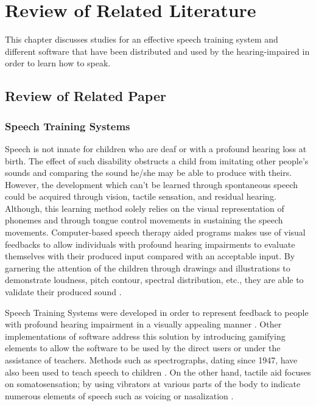 %
%
%                 

\chapter{Review of Related Literature}
\label{sec:relatedlit}

This chapter discusses studies for an effective speech training system and different software that have been distributed and used by the hearing-impaired in order to learn how to speak.

\section{Review of Related Paper}

\subsection{Speech Training Systems}

Speech is not innate for children who are deaf or with a profound hearing loss at birth. The effect of such disability obstructs a child from imitating other people’s sounds and comparing the sound he/she may be able to produce with theirs. However, the development which can’t be learned through spontaneous speech could be acquired through vision, tactile sensation, and residual hearing. Although, this learning method solely relies on the visual representation of phonemes and through tongue control movements in sustaining the speech movements. Computer-based speech therapy aided programs makes use of visual feedbacks to allow individuals with profound hearing impairments to evaluate themselves with their produced input compared with an acceptable input. By garnering the attention of the children through drawings and illustrations to demonstrate loudness, pitch contour, spectral distribution, etc., they are able to validate their produced sound \cite{oster:2006:cbs}.

Speech Training Systems were developed in order to represent feedback to people with profound hearing impairment in a visually appealing manner \cite{oster:2006:cbs}. Other implementations of software address this solution by introducing gamifying elements to allow the software to be used by the direct users or under the assistance of teachers. Methods such as spectrographs, dating since 1947, have also been used to teach speech to children \cite{javkin:1993:msa}. On the other hand, tactile aid focuses on somatosensation; by using vibrators at various parts of the body to indicate numerous elements of speech such as voicing or nasalization \cite{wankhede:2014:dvs}.

